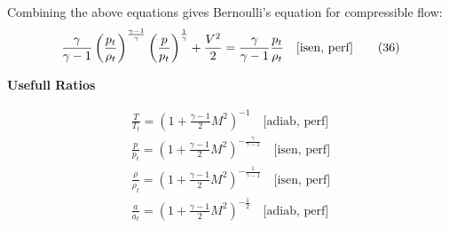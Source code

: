 \begin{multicols}{2}
Combining the above equations gives Bernoulli's equation for compressible flow:
\begin{equation}
\frac{\gamma}{\gamma - 1} \left(\frac{p_t}{\rho_t}\right)^{\frac{\gamma - 1}{\gamma}} \left(\frac{p}{p_t}\right)^{\frac{1}{\gamma}} + \frac{V^2}{2} = \frac{\gamma}{\gamma - 1} \frac{p_t}{\rho_t}
\\ \quad \text{[isen, perf]} \tag{36}
\end{equation}

\textbf{Usefull Ratios}

\begin{gather}
\frac{T}{T_t} = \left(1 + \frac{\gamma - 1}{2} M^2 \right)^{-1}
\quad \text{[adiab, perf]} \tag{43} \\
\frac{p}{p_t} = \left(1 + \frac{\gamma - 1}{2} M^2 \right)^{-\frac{\gamma}{\gamma - 1}}
\quad \text{[isen, perf]} \tag{44} \\
\frac{\rho}{\rho_t} = \left(1 + \frac{\gamma - 1}{2} M^2 \right)^{-\frac{1}{\gamma - 1}}
\quad \text{[isen, perf]} \tag{45} \\
\frac{a}{a_t} = \left(1 + \frac{\gamma - 1}{2} M^2 \right)^{-\frac{1}{2}}
\quad \text{[adiab, perf]} \tag{46}
\end{gather}

\end{multicols}